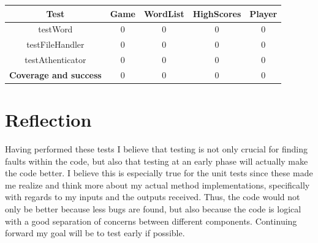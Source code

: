 \documentclass[12pt, letterpaper]{article}
\begin{document}
\begin{center}
	\begin{tabular}{|c|c|c|c|c|} 
		\hline
		\textbf{Test} & \textbf{Game} & \textbf{WordList} & \textbf{HighScores} & \textbf{Player} \\ [0.5ex] 
		\hline\hline
		testWord & 0 & 0 & 0 & 0  \\
		\hline
		testFileHandler & 0 & 0 & 0 & 0  \\
		\hline 
		testAthenticator & 0 & 0 & 0 & 0  \\
		\hline  		
		\hline
		\textbf{Coverage and success} & 0 & 0 & 0 & 0  \\[1ex]
		\hline 
	\end{tabular}
\end{center}
\section{Reflection}
Having performed these tests I believe that testing is not only crucial for finding faults within the code, but also that testing at an early phase will actually make the code better. I believe this is especially true for the unit tests since these made me realize and think more about my actual method implementations, specifically with regards to my inputs and the outputs received. Thus, the code would not only be better because less bugs are found, but also because the code is logical with a good separation of concerns between different components. Continuing forward my goal will be to test early if possible.
\end{document}

